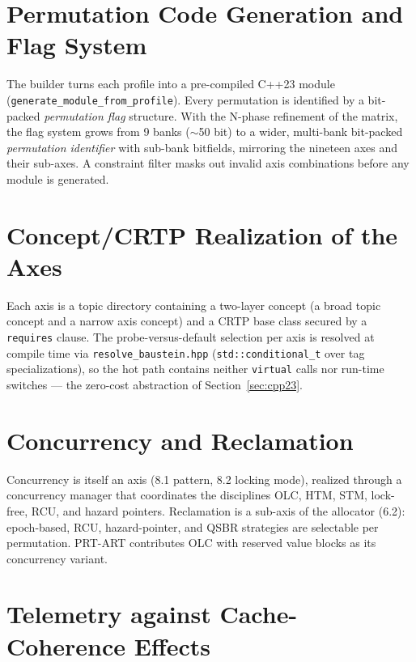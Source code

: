 \section{Permutation Code Generation and Flag System}\label{sec:codegen}

The builder turns each profile into a pre-compiled C++23 module
(\texttt{generate\_\allowbreak{}module\_\allowbreak{}from\_\allowbreak{}profile}). Every permutation is
identified by a bit-packed \emph{permutation flag} structure. With the N-phase refinement of the
matrix, the flag system grows from 9 banks ($\sim$50 bit) to a wider, multi-bank bit-packed
\emph{permutation identifier} with sub-bank bitfields, mirroring the nineteen axes and their
sub-axes. A constraint filter masks out invalid axis combinations before any module is generated.

\section{Concept/CRTP Realization of the Axes}\label{sec:concept-crtp}

Each axis is a topic directory containing a two-layer concept (a broad topic concept and a narrow
axis concept) and a CRTP base class secured by a \texttt{requires} clause. The probe-versus-default
selection per axis is resolved at compile time via \texttt{resolve\_baustein.hpp}
(\texttt{std::conditional\_t} over tag specializations), so the hot path contains neither
\texttt{virtual} calls nor run-time switches --- the zero-cost abstraction of
Section~\ref{sec:cpp23}.

\section{Concurrency and Reclamation}\label{sec:concurrency}

Concurrency is itself an axis (8.1 pattern, 8.2 locking mode), realized through a concurrency
manager that coordinates the disciplines OLC, HTM, STM, lock-free, RCU, and hazard pointers.
Reclamation is a sub-axis of the allocator (6.2): epoch-based, RCU, hazard-pointer, and QSBR
strategies are selectable per permutation. PRT-ART contributes OLC with reserved value blocks as its
concurrency variant.

\section{Telemetry against Cache-Coherence Effects}\label{sec:telemetry}

